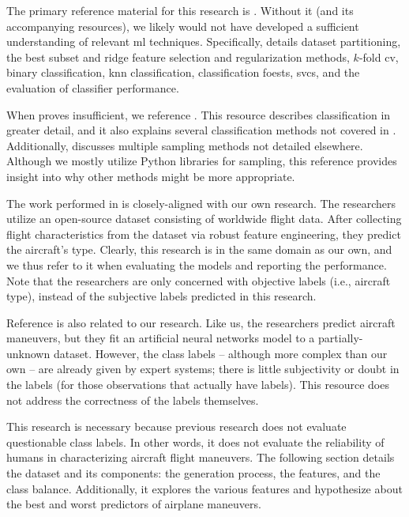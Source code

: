 \documentclass[../main.tex]{subfiles}
\begin{document}

The primary reference material for this research is \cite{James2013}. Without it (and its accompanying resources), we likely would not have developed a sufficient understanding of relevant \ac{ml} techniques. Specifically, \cite{James2013} details dataset partitioning, the best subset and ridge feature selection and regularization methods, $k$-fold \ac{cv}, binary classification, \ac{knn} classification, classification foests, \acp{svc}, and the evaluation of classifier performance.

When \cite{James2013} proves insufficient, we reference \cite{Bishop2006}. This resource describes classification in greater detail, and it also explains several classification methods not covered in \cite{James2013}. Additionally, \cite{Bishop2006} discusses multiple sampling methods not detailed elsewhere. Although we mostly utilize Python libraries for sampling, this reference provides insight into why other methods might be more appropriate.

The work performed in \cite{Blanks2017} is closely-aligned with our own research. The researchers utilize an open-source dataset consisting of worldwide flight data. After collecting flight characteristics from the dataset via robust feature engineering, they predict the aircraft's type. Clearly, this research is in the same domain as our own, and we thus refer to it when evaluating the models and reporting the performance. Note that the researchers are only concerned with objective labels (i.e., aircraft type), instead of the subjective labels predicted in this research.

Reference \cite{Rodin1992} is also related to our research. Like us, the researchers predict aircraft maneuvers, but they fit an artificial neural networks model to a partially-unknown dataset. However, the class labels -- although more complex than our own -- are already given by expert systems; there is little subjectivity or doubt in the labels (for those observations that actually have labels). This resource does not address the correctness of the labels themselves.


This research is necessary because previous research does not evaluate questionable class labels. In other words, it does not evaluate the reliability of humans in characterizing aircraft flight maneuvers. The following section details the dataset and its components: the generation process, the features, and the class balance. Additionally, it explores the various features and hypothesize about the best and worst predictors of airplane maneuvers.
\end{document}
